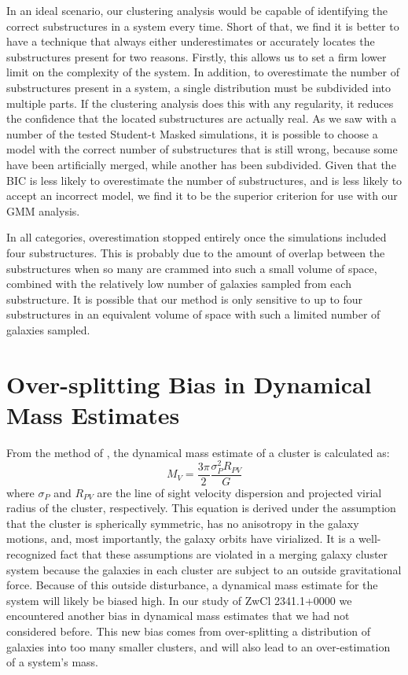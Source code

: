 \documentclass[onecolumn]{aastex}
\begin{document}
In an ideal scenario, our clustering analysis would be capable of identifying the correct substructures in a system every time.  Short of that, we find it is better to have a technique that always either underestimates or accurately locates the substructures present for two reasons.  Firstly, this allows us to set a firm lower limit on the complexity of the system.  In addition, to overestimate the number of substructures present in a system, a single distribution must be subdivided into multiple parts.  If the clustering analysis does this with any regularity, it reduces the confidence that the located substructures are actually real.  As we saw with a number of the tested Student-t Masked simulations, it is possible to choose a model with the correct number of substructures that is still wrong, because some have been artificially merged, while another has been subdivided.  Given that the BIC is less likely to overestimate the number of substructures, and is less likely to accept an incorrect model, we find it to be the superior criterion for use with our GMM analysis.

In all categories, overestimation stopped entirely once the simulations included four substructures.  This is probably due to the amount of overlap between the substructures when so many are crammed into such a small volume of space, combined with the relatively low number of galaxies sampled from each substructure.  It is possible that our method is only sensitive to up to four substructures in an equivalent volume of space with such a limited number of galaxies sampled.




\section{Over-splitting Bias in Dynamical Mass Estimates}
From the method of \cite{Girardi98}, the dynamical mass estimate of a cluster is calculated as:
\begin{equation}
M_{V} = \frac{3\pi}{2} \frac{\sigma^2_P R_{PV}}{G}
\end{equation}
where $\sigma_{P}$ and $R_{PV}$ are the line of sight velocity dispersion and projected virial radius of the cluster, respectively.  This equation is derived under the assumption that the cluster is spherically symmetric, has no anisotropy in the galaxy motions, and, most importantly, the galaxy orbits have virialized.  It is a well-recognized fact that these assumptions are violated in a merging galaxy cluster system because the galaxies in each cluster are subject to an outside gravitational force.  Because of this outside disturbance, a dynamical mass estimate for the system will likely be biased high.  In our study of ZwCl 2341.1+0000 we encountered another bias in dynamical mass estimates that we had not considered before.  This new bias comes from over-splitting a distribution of galaxies into too many smaller clusters, and will also lead to an over-estimation of a system's mass.
\end{document}
